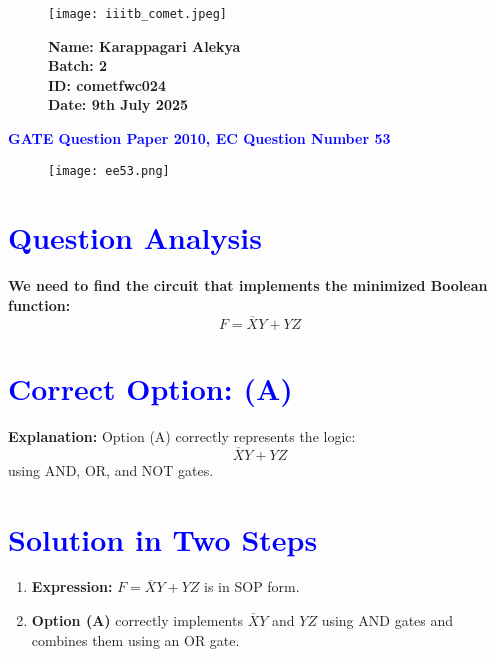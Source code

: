 \documentclass[twocolumn]{article}
\begin{document}
\begin{figure}[H]
    \begin{minipage}{0.45\textwidth}
        \texttt{[image: iiitb\_comet.jpeg]} %
    \end{minipage} \hfill
    \begin{minipage}{0.45\textwidth}
        \textbf{Name: Karappagari Alekya} \\
        \textbf{Batch: 2} \\
        \textbf{ID: cometfwc024} \\
        \textbf{Date: 9th July 2025}
    \end{minipage}
\end{figure}

\begin{center}
    {\LARGE \textbf{\textcolor{blue}{GATE Question Paper 2010, EC Question Number 53}}}
\end{center}

\vspace{1em}
\begin{figure}[H]
    \centering
    \texttt{[image: ee53.png]} %
\end{figure}

\section*{\textcolor{blue}{Question Analysis}}
\textbf{We need to find the circuit that implements the minimized Boolean function:}
\[
F = \overline{X}Y + YZ
\]

\section*{\textcolor{blue}{Correct Option: (A)}}
\textbf{Explanation:} Option (A) correctly represents the logic:
\[
\overline{X}Y + YZ
\]
using AND, OR, and NOT gates.

\section*{\textcolor{blue}{Solution in Two Steps}}
\begin{enumerate}[label=\textbf{Step \arabic*:}]
    \item \textbf{Expression:} \( F = \overline{X}Y + YZ \) is in SOP form.
    \item \textbf{Option (A)} correctly implements \( \overline{X}Y \) and \( YZ \) using AND gates and combines them using an OR gate.
\end{enumerate}
\end{document}
